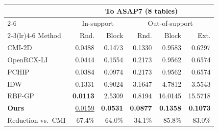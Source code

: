 \scriptsize
\setlength{\tabcolsep}{1.5pt}
\begin{tabular*}{\linewidth}{@{\extracolsep{\fill}}lrrrrr@{}}\toprule
 & \multicolumn{5}{c}{To ASAP7 (8 tables)} \\
\cmidrule(lr){2-6}
 & \multicolumn{2}{c}{In-support} & \multicolumn{3}{c}{Out-of-support} \\
\cmidrule(lr){2-3}\cmidrule(lr){4-6}
Method & Rnd. & Block & Rnd. & Block & Ext. \\
\midrule
CMI-2D & 0.0488 & 0.1473 & 0.1330 & 0.9583 & 0.6297 \\
OpenRCX-LI & 0.0444 & 0.1554 & 0.2173 & 0.9562 & 0.6574 \\
PCHIP & 0.0384 & 0.0974 & 0.2173 & 0.9562 & 0.6574 \\
IDW & 0.1331 & 0.9024 & 3.1647 & 4.7812 & 3.5543 \\
RBF-GP & \textbf{0.0113} & 2.5309 & 0.8194 & 16.0145 & 15.5718 \\
\midrule
\textbf{Ours} & \underline{0.0159} & \textbf{0.0531} & \textbf{0.0877} & \textbf{0.1358} & \textbf{0.1073} \\
\midrule
Reduction vs.\ CMI & 67.4\% & 64.0\% & 34.1\% & 85.8\% & 83.0\% \\
\bottomrule\end{tabular*}
